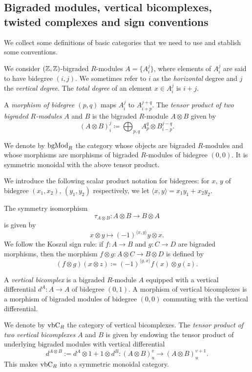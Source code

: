 \documentclass[Thesis.tex]{subfiles}
\begin{document}
\subsection{Bigraded modules, vertical bicomplexes, twisted complexes and sign conventions}


We collect some definitions of basic categories that we need to use and stablish some conventions.

\begin{defin}
We consider $(\mathbb{Z},\mathbb{Z})$-bigraded
$R$-modules $A = \{A^j_i\}$, where elements of $A^j_i$ are said to have bidegree $(i, j)$. We sometimes refer to $i$
as the \emph{horizontal} degree and $j$ the \emph{vertical degree}. The \emph{total degree} of an element $x ∈ A^j_i$ is $i+j$.
\end{defin}
\begin{defin}
A \emph{morphism of bidegree $(p, q)$} maps $A^j_i$ to $A^{j+q}_{i+p}$. The \emph{tensor product of two bigraded $R$-modules} $A$
and $B$ is the bigraded $R$-module $A ⊗ B$ given by
\[(A ⊗ B)^j_i \coloneqq\bigoplus_{p,q}A^q_p ⊗ B^{j−q}_{i−p} .\]
\end{defin}
We denote by $\mathrm{bgMod}_R$ the category whose objects are bigraded $R$-modules and whose morphisms
are morphisms of bigraded $R$-modules of bidegree $(0, 0)$. It is symmetric monoidal with the above
tensor product.

We introduce the following scalar product notation for bidegrees: for $x$, $y$ of bidegree $(x_1, x_2)$, $(y_1, y_2)$
respectively, we let $\langle x, y\rangle = x_1y_1 + x_2y_2$.

The symmetry isomorphism
\[τ_{A⊗B} : A ⊗ B → B ⊗ A\]
is given by
\[x ⊗ y \mapsto (−1)^{\langle x,y\rangle}y ⊗ x.\]
We follow the Koszul sign rule: if $f : A → B$ and $g : C → D$ are bigraded morphisms, then the
morphism $f ⊗ g : A ⊗ C → B ⊗ D$ is defined by
\[(f ⊗ g)(x ⊗ z) \coloneqq (−1)^{\langle g,x\rangle}f(x) ⊗ g(z).\]

\begin{defin}
A \emph{vertical bicomplex} is a bigraded $R$-module $A$ equipped with a vertical differential $d^A : A → A$ of bidegree $(0, 1)$. A morphism of vertical bicomplexes is a morphism of bigraded modules
of bidegree $(0, 0)$ commuting with the vertical differential.
\end{defin}

We denote by $\mathrm{vbC}_R$ the category of vertical bicomplexes. The \emph{tensor product of two vertical bicomplexes} $A$ and $B$ is given by endowing the tensor product of underlying bigraded modules with
vertical differential \[d^{A⊗B} := d^A ⊗ 1 + 1 ⊗ d^B : (A ⊗ B)^v_u → (A ⊗ B)^{v+1}_u .\] This makes $\mathrm{vbC}_R$ into a
symmetric monoidal category.
\end{document}
